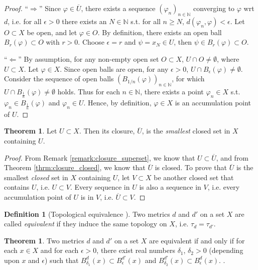 \documentclass[12pt, a4paper]{article}
\numberwithin{equation}{section}
\theoremstyle{definition}
\theoremstyle{definition}
\newtheorem{defn}[thm]{Definition} %
\newtheorem{theorem}[thm]{Theorem}
\begin{document}
	\begin{proof}
		\enquote{$\Longrightarrow$} Since $\varphi\in\overline{U}$, there exists a sequence $\left(\varphi_n\right)_{n\in\mathbb N}$ converging to $\varphi$ wrt $d$, i.e. for all $\epsilon > 0$ there exists an $N\in\mathbb N$ s.t. for all $n\geq N$, $d(\varphi_n, \varphi) < \epsilon$. Let $O\subset X$ be open, and let $\varphi\in O$. By definition, there exists an open ball $B_{r}(\varphi)\subset O$ with $r > 0$. Choose $\epsilon = r$ and $\psi = x_{N}\in U$, then $\psi\in B_{r}(\varphi) \subset O$.
		
		\enquote{$\Longleftarrow$} By assumption, for any non-empty open set $O\subset X$, $U\cap O\ne\emptyset$, where $U\subset X$. Let $\varphi\in X$. Since open balls are open, for any $\epsilon > 0$, $U\cap B_{\epsilon}(\varphi)\ne\emptyset$. Consider the sequence of open balls $\left( B_{1/n}(\varphi)\right)_{n\in\mathbb N}$, for which $U\cap B_{\frac{1}{n}}(\varphi) \ne \emptyset$ holds. Thus for each $n\in\mathbb N$, there exists a point $\varphi_{n}\in X$ s.t. $\varphi_n \in B_{\frac{1}{n}}(\varphi)$ and $\varphi_n\in U$. Hence, by definition, $\varphi\in X$ is an accumulation point of $U$.
	\end{proof}
	
	\begin{theorem}
		Let $U\subset X$. Then its closure, $\overline{U}$, is the \textit{smallest} closed set in $X$ containing $U$.
	\end{theorem}

	\begin{proof}
		From Remark \ref{remark:closure_superset}, we know that $U\subset \overline{U}$, and from Theorem \ref{thrm:closure_closed}, we know that $\overline{U}$ is closed. To prove that $\overline{U}$ is the smallest \textit{closed} set in $X$ containing $U$, let $V\subset X$ be another closed set that contains $U$, i.e. $U\subset V$. Every sequence in $U$ is also a sequence in $V$, i.e. every accumulation point of $U$ is in $V$, i.e. $\overline{U}\subset V$.
	\end{proof}

	\begin{defn}[Topological equivalence \cite{topology-singh}]
		Two metrics $d$ and $d'$ on a set $X$ are called \textit{equivalent} if they induce the same topology on $X$, i.e. $\tau_d = \tau_{d'}$.
	\end{defn}

	\begin{theorem}\label{thrm:topological_equivalence}
		Two metrics $d$ and $d'$ on a set $X$ are equivalent if and only if for each $x\in X$ and for each $\epsilon > 0$, there exist real numbers $\delta_1$, $\delta_2 > 0$ (depending upon $x$ and $\epsilon$) such that $B^{d}_{\delta_1}(x) \subset B^{d'}_{\epsilon}(x)$ and $B^{d'}_{\delta_2}(x) \subset B^{d}_{\epsilon}(x)$. \cite{topology-singh}.
	\end{theorem}
\end{document}

